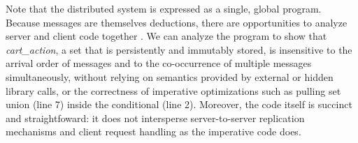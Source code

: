 



Note that the distributed system is expressed as a single, global program.
Because messages are themselves deductions, there are opportunities to 
analyze server and client code together .  We can analyze the program to 
show that {\em cart\_action}, a set that is persistently and immutably
stored, is insensitive to the arrival order of messages 
and to the co-occurrence of multiple messages simultaneously, without relying
on semantics provided by external or hidden library calls, or the correctness of imperative optimizations such as pulling set union (line 7) inside the conditional (line 2).  Moreover, the code itself is succinct and straightfoward: it does not intersperse server-to-server replication mechanisms and client request handling as the imperative code does.

